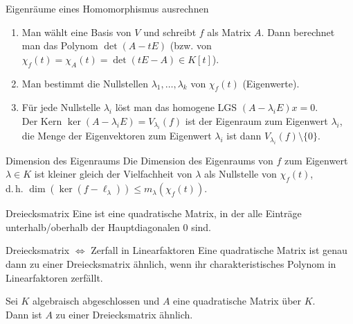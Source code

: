 \begin{Prozedur}{Eigenräume eines Homomorphismus ausrechnen}
    \begin{enumerate}
        \item Man wählt eine Basis von $V$ und schreibt $f$ als Matrix $A$.
        Dann berechnet man das Polynom $\det(A - tE)$ (bzw. von
        $\chi_f(t) = \chi_A(t) = \det(tE - A) \in K[t]$).
        
        \item Man bestimmt die Nullstellen $\lambda_1, \ldots, \lambda_k$ von
        $\chi_f(t)$ (Eigenwerte).
        
        \item Für jede Nullstelle $\lambda_i$ löst man das homogene LGS
        $(A - \lambda_i E) x = 0$. \\
        Der Kern $\ker (A - \lambda_i E) = V_{\lambda_i}(f)$ ist der Eigenraum
        zum Eigenwert $\lambda_i$, die Menge der Eigenvektoren zum Eigenwert
        $\lambda_i$ ist dann $V_{\lambda_i}(f) \setminus \{0\}$.
    \end{enumerate}    
\end{Prozedur}

\begin{Satz}{Dimension des Eigenraums}
    Die Dimension des Eigenraums von $f$ zum Eigenwert $\lambda \in K$ ist
    kleiner gleich der Vielfachheit von $\lambda$ als Nullstelle von
    $\chi_f(t)$, \\
    d.\,h. $\dim(\ker(f - \ell_\lambda)) \le m_\lambda(\chi_f(t))$.
\end{Satz}

\begin{Def}{Dreiecksmatrix}
    Eine  ist eine
    quadratische Matrix,
    in der alle Einträge unterhalb/oberhalb der Hauptdiagonalen $0$ sind.
\end{Def}

\begin{Satz}{Dreiecksmatrix $\Leftrightarrow$ Zerfall in Linearfaktoren}
    Eine quadratische Matrix ist genau dann zu einer Dreiecksmatrix ähnlich,
    wenn ihr charakteristisches Polynom in Linearfaktoren zerfällt.
\end{Satz}

\begin{Kor}
    Sei $K$ algebraisch abgeschlossen und $A$ eine quadratische Matrix über
    $K$. \\
    Dann ist $A$ zu einer Dreiecksmatrix ähnlich.
\end{Kor}

